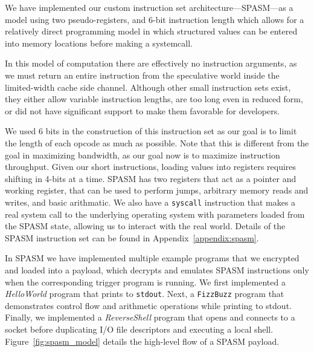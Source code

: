 We have implemented our custom instruction set architecture---SPASM---as a model
using two pseudo-registers, and
6-bit instruction length which allows for a relatively direct programming model
in which structured values can be entered into memory locations before making
a systemcall.


%

In this model of computation there are effectively no instruction arguments, as we must
return an entire instruction from the speculative world inside the limited-width
cache side channel. Although other small
instruction sets exist, they either allow variable instruction
lengths, are too long even in reduced form, or did not have significant support
to make them favorable for developers.

We used 6 bits in the construction of this instruction set as our
goal is to limit the length of each opcode as much as possible. Note that this
is different from the goal in maximizing bandwidth, as our goal now is to
maximize instruction throughput. Given our short instructions, loading values into registers
requires shifting in 4-bits at a time. SPASM has two registers that act as a
pointer and working register, that can be used to perform jumps, arbitrary
memory reads and writes, and basic arithmatic. We also have a \texttt{syscall}
instruction that makes a real system call to the underlying operating system
with parameters loaded from the SPASM state, allowing us to interact with the
real world. Details of
the SPASM instruction set can be found in Appendix~\ref{appendix:spasm}. 

In SPASM we have implemented multiple example programs that we encrypted and
loaded into a \speculake payload, which decrypts and emulates SPASM instructions
only when the corresponding trigger program is running.
We first implemented a \textit{HelloWorld}
program that prints to \texttt{stdout}. Next, a \texttt{FizzBuzz} program that
demonstrates control flow and arithmetic operations while printing to stdout.
Finally, we implemented a \textit{ReverseShell} program that opens and connects to a socket
before duplicating I/O file descriptors and executing a local shell.
Figure~\ref{fig:spasm_model} details the high-level flow of a SPASM payload.


